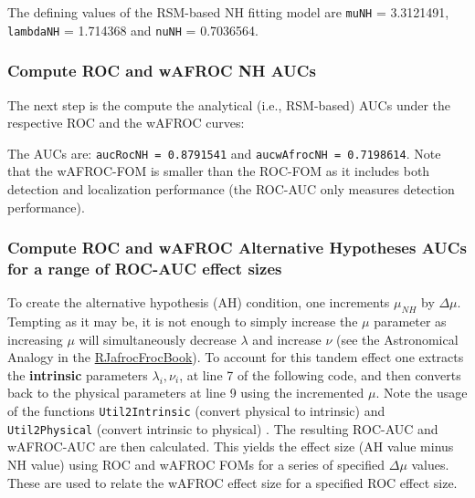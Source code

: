 \documentclass[
]{book}
\newenvironment{Shaded}{\begin{snugshade}}{\end{snugshade}}
\newcommand{\AttributeTok}[1]{\textcolor[rgb]{0.77,0.63,0.00}{#1}}
\newcommand{\FunctionTok}[1]{\textcolor[rgb]{0.00,0.00,0.00}{#1}}
\newcommand{\NormalTok}[1]{#1}
\newcommand{\OtherTok}[1]{\textcolor[rgb]{0.56,0.35,0.01}{#1}}
\newcommand{\SpecialCharTok}[1]{\textcolor[rgb]{0.00,0.00,0.00}{#1}}
\begin{document}
The defining values of the RSM-based NH fitting model are \texttt{muNH} = 3.3121491, \texttt{lambdaNH} = 1.714368 and \texttt{nuNH} = 0.7036564.

\hypertarget{compute-roc-and-wafroc-nh-aucs}{%
\subsubsection{Compute ROC and wAFROC NH AUCs}\label{compute-roc-and-wafroc-nh-aucs}}

The next step is the compute the analytical (i.e., RSM-based) AUCs under the respective ROC and the wAFROC curves:

\begin{Shaded}
\end{Shaded}

The AUCs are: \texttt{aucRocNH\ =\ 0.8791541} and \texttt{aucwAfrocNH\ =\ 0.7198614}. Note that the wAFROC-FOM is smaller than the ROC-FOM as it includes both detection and localization performance (the ROC-AUC only measures detection performance).

\hypertarget{compute-roc-and-wafroc-alternative-hypotheses-aucs-for-a-range-of-roc-auc-effect-sizes}{%
\subsubsection{Compute ROC and wAFROC Alternative Hypotheses AUCs for a range of ROC-AUC effect sizes}\label{compute-roc-and-wafroc-alternative-hypotheses-aucs-for-a-range-of-roc-auc-effect-sizes}}

To create the alternative hypothesis (AH) condition, one increments \(\mu_{NH}\) by \(\Delta\mu\). Tempting as it may be, it is not enough to simply increase the \(\mu\) parameter as increasing \(\mu\) will simultaneously decrease \(\lambda\) and increase \(\nu\) (see the Astronomical Analogy in the \href{https://dpc10ster.github.io/RJafrocFrocBook/froc-paradigm.html\#froc-paradigm-solar-analogy}{RJafrocFrocBook}). To account for this tandem effect one extracts the \textbf{intrinsic} parameters \(\lambda_i, \nu_i\), at line 7 of the following code, and then converts back to the physical parameters at line 9 using the incremented \(\mu\). Note the usage of the functions \texttt{Util2Intrinsic} (convert physical to intrinsic) and \texttt{Util2Physical} (convert intrinsic to physical) . The resulting ROC-AUC and wAFROC-AUC are then calculated. This yields the effect size (AH value minus NH value) using ROC and wAFROC FOMs for a series of specified \(\Delta\mu\) values. These are used to relate the wAFROC effect size for a specified ROC effect size.
\end{document}
